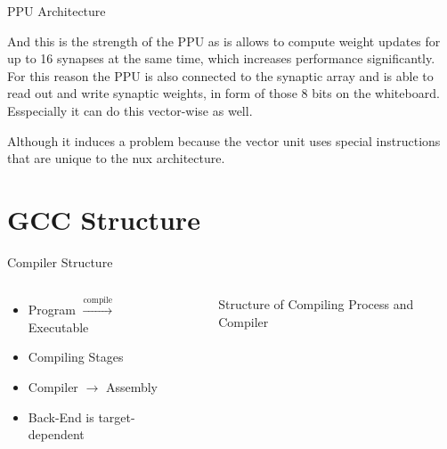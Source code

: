 \documentclass[10pt,aspectratio=169]{beamer}
\begin{document}
\begin{frame}{PPU Architecture}
{		And this is the strength of the PPU as is allows to compute weight updates for up to 16 synapses at the same time, which increases performance significantly. 
		For this reason the PPU is also connected to the synaptic array and is able to read out and write synaptic weights, in form of those 8 bits on the whiteboard.
		Esspecially it can do this vector-wise as well.

		Although it induces a problem because the vector unit uses special instructions that are unique to the nux architecture.
}
\end{frame}



\section{GCC Structure}
\begin{frame}[fragile]{Compiler Structure}
    \begin{columns}[c]
    \begin{column}{0.5\textwidth}
        \begin{itemize}
			\setlength\itemsep{1em}
            \item Program $\xrightarrow{\text{compile}}$ Executable
			\item Compiling Stages
			\item Compiler $\rightarrow$ Assembly
			\item Back-End is target-dependent
        \end{itemize}
    \end{column}

    \begin{column}{0.5\textwidth}
        \centering
        \begin{figure}
            \begin{adjustbox}{center, max width={.5\columnwidth}}
                
                
            \end{adjustbox}
            \caption{\label{fig:compiler} Structure of Compiling Process and Compiler}
        \end{figure}
    \end{column}
    \end{columns}
\end{frame}
\end{document}
